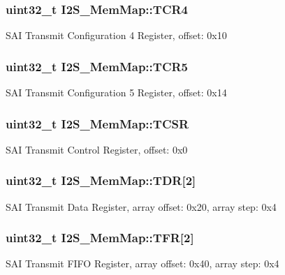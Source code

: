 \subsubsection[{T\+C\+R4}]{\setlength{\rightskip}{0pt plus 5cm}uint32\+\_\+t I2\+S\+\_\+\+Mem\+Map\+::\+T\+C\+R4}\label{struct_i2_s___mem_map_a933a94f14922497e04bd3178585e6288}
S\+A\+I Transmit Configuration 4 Register, offset\+: 0x10 \hypertarget{struct_i2_s___mem_map_ac559d60e95112859062a4a5427ebbc61}{}
\subsubsection[{T\+C\+R5}]{\setlength{\rightskip}{0pt plus 5cm}uint32\+\_\+t I2\+S\+\_\+\+Mem\+Map\+::\+T\+C\+R5}\label{struct_i2_s___mem_map_ac559d60e95112859062a4a5427ebbc61}
S\+A\+I Transmit Configuration 5 Register, offset\+: 0x14 \hypertarget{struct_i2_s___mem_map_a6a6cb435306769616551657a370e1aec}{}
\subsubsection[{T\+C\+S\+R}]{\setlength{\rightskip}{0pt plus 5cm}uint32\+\_\+t I2\+S\+\_\+\+Mem\+Map\+::\+T\+C\+S\+R}\label{struct_i2_s___mem_map_a6a6cb435306769616551657a370e1aec}
S\+A\+I Transmit Control Register, offset\+: 0x0 \hypertarget{struct_i2_s___mem_map_afc89841d02aecd4cadeb60365f27db8d}{}
\subsubsection[{T\+D\+R}]{\setlength{\rightskip}{0pt plus 5cm}uint32\+\_\+t I2\+S\+\_\+\+Mem\+Map\+::\+T\+D\+R\mbox{[}2\mbox{]}}\label{struct_i2_s___mem_map_afc89841d02aecd4cadeb60365f27db8d}
S\+A\+I Transmit Data Register, array offset\+: 0x20, array step\+: 0x4 \hypertarget{struct_i2_s___mem_map_a85e13567695b53facaafbfdde35b8b0c}{}
\subsubsection[{T\+F\+R}]{\setlength{\rightskip}{0pt plus 5cm}uint32\+\_\+t I2\+S\+\_\+\+Mem\+Map\+::\+T\+F\+R\mbox{[}2\mbox{]}}\label{struct_i2_s___mem_map_a85e13567695b53facaafbfdde35b8b0c}
S\+A\+I Transmit F\+I\+F\+O Register, array offset\+: 0x40, array step\+: 0x4 \hypertarget{struct_i2_s___mem_map_a52b2dd69044a5f8c990749c314664ae1}{}
